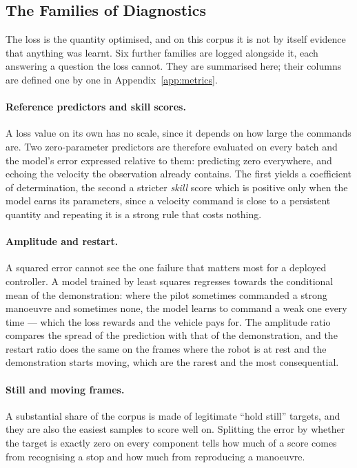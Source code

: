 \subsection{The Families of Diagnostics}
\label{sec:metrics-families}

The loss is the quantity optimised, and on this corpus it is not by itself
evidence that anything was learnt. Six further families are logged alongside it,
each answering a question the loss cannot. They are summarised here; their
columns are defined one by one in Appendix~\ref{app:metrics}.

\paragraph{Reference predictors and skill scores.}
A loss value on its own has no scale, since it depends on how large the commands
are. Two zero-parameter predictors are therefore evaluated on every batch and
the model's error expressed relative to them: predicting zero everywhere, and
echoing the velocity the observation already contains. The first yields a
coefficient of determination, the second a stricter \emph{skill} score which is
positive only when the model earns its parameters, since a velocity command is
close to a persistent quantity and repeating it is a strong rule that costs
nothing.

\paragraph{Amplitude and restart.}
A squared error cannot see the one failure that matters most for a deployed
controller. A model trained by least squares regresses towards the conditional
mean of the demonstration: where the pilot sometimes commanded a strong
manoeuvre and sometimes none, the model learns to command a weak one every time
--- which the loss rewards and the vehicle pays for. The amplitude ratio
compares the spread of the prediction with that of the demonstration, and the
restart ratio does the same on the frames where the robot is at rest and the
demonstration starts moving, which are the rarest and the most consequential.

\paragraph{Still and moving frames.}
A substantial share of the corpus is made of legitimate ``hold still'' targets,
and they are also the easiest samples to score well on. Splitting the error by
whether the target is exactly zero on every component tells how much of a score
comes from recognising a stop and how much from reproducing a manoeuvre.

